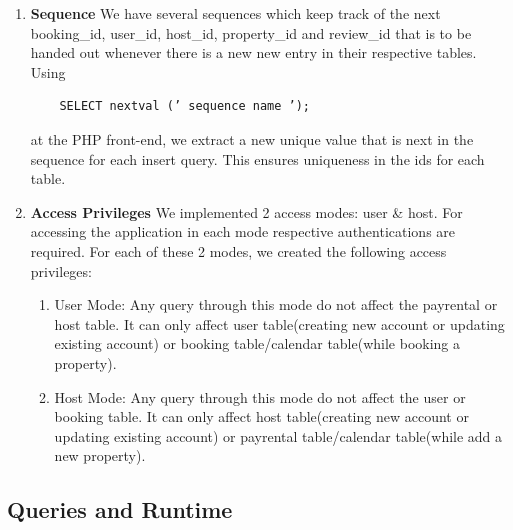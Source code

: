 \documentclass[10pt]{article}
\begin{document}
\begin{enumerate}
\item \textbf{Sequence} \newline
We have several sequences which keep track of the next booking\_id, user\_id, host\_id, property\_id and review\_id that is to be handed out whenever there is a new new entry in their respective tables. Using
\begin{verbatim}
    SELECT nextval (’ sequence name ’);
\end{verbatim}
at the PHP front-end, we extract a new unique value that is next in the sequence for each insert query. This ensures uniqueness in the ids for each table.

\item \textbf{Access Privileges} \newline
We implemented 2 access modes: user & host. For accessing the application in each mode respective authentications are required. For each of these 2 modes, we
created the following access privileges:
\begin{enumerate}
    \item User Mode: Any query through this mode do not affect the payrental or host table. It can only affect user table(creating new account or updating existing account) or booking table/calendar table(while booking a property).
    \item Host Mode: Any query through this mode do not affect the user or booking table. It can only affect host table(creating new account or updating existing account) or payrental table/calendar table(while add a new property).
\end{enumerate}

\end{enumerate}

\subsection{Queries and Runtime}
\end{document}
